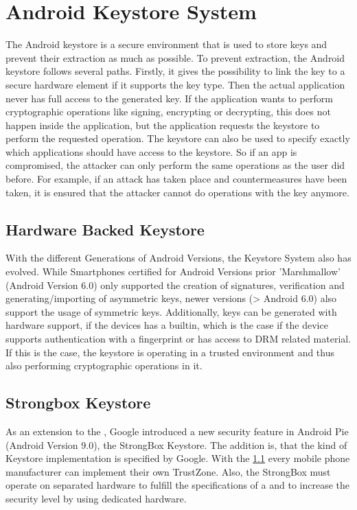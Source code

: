 \documentclass[12pt,oneside,a4paper,parskip]{scrbook}
\begin{document}
\section{Android Keystore System}

The Android keystore is a secure environment that is used to store keys and prevent their extraction as much as possible. To prevent extraction, the Android keystore follows several paths. Firstly, it gives the possibility to link the key to a secure hardware element if it supports the key type. Then the actual application never has full access to the generated key. If the application wants to perform cryptographic operations like signing, encrypting or decrypting, this does not happen inside the application, but the application requests the keystore to perform the requested operation. The keystore can also be used to specify exactly which applications should have access to the keystore. So if an app is compromised, the attacker can only perform the same operations as the user did before. For example, if an attack has taken place and countermeasures have been taken, it is ensured that the attacker cannot do operations with the key anymore. 
\parencite{google_android_2020}

\subsection{Hardware Backed Keystore}
\label{android:HWB}

With the different Generations of Android Versions, the Keystore System also has evolved. While Smartphones certified for Android Versions prior 'Marshmallow' (Android Version 6.0) only supported the creation of signatures, verification and generating/importing of asymmetric keys, newer versions (> Android 6.0) also support the usage of symmetric keys. Additionally, keys can be generated with hardware support, if the devices has a  builtin, which is the case if the device supports authentication with a fingerprint or has access to DRM related material. If this is the case, the keystore is operating in a trusted environment and thus also performing cryptographic operations in it.
\parencite{google_hardware-backed_2020}


\subsection{Strongbox Keystore}

As an extension to the , Google introduced a new security feature in Android Pie (Android Version 9.0), the StrongBox Keystore. The addition is, that the kind of Keystore implementation is specified by Google. With the \ref{android:HWB} every mobile phone manufacturer can implement their own TrustZone. Also, the StrongBox must operate on separated hardware to fulfill the specifications of a  and to increase the security level by using dedicated hardware.
\end{document}
